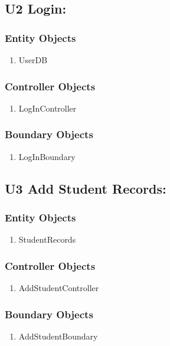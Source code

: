 \documentclass{scrreprt}
\begin{document}
\subsection{U2 Login:}
\subsubsection{Entity Objects}
\begin{enumerate}
  \item UserDB
\end{enumerate}
\subsubsection{Controller Objects}
\begin{enumerate}
  \item LogInController
\end{enumerate}
\subsubsection{Boundary Objects}
\begin{enumerate}
  \item LogInBoundary
\end{enumerate}
\subsection{U3 Add Student Records:}
\subsubsection{Entity Objects}
\begin{enumerate}
  \item StudentRecords
\end{enumerate}
\subsubsection{Controller Objects}
\begin{enumerate}
  \item AddStudentController
\end{enumerate}
\subsubsection{Boundary Objects}
\begin{enumerate}
  \item AddStudentBoundary
\end{enumerate}
\end{document}
